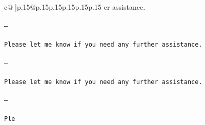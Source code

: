 \documentclass{article}
\begin{document}
{\begin{supertabular}{c@{$\;$}|p{.15\linewidth}@{}p{.15\linewidth}p{.15\linewidth}p{.15\linewidth}p{.15\linewidth}p{.15\linewidth}}
{{{er assistance. \\ \tt \\ \tt ---\\ \tt \\ \tt Please let me know if you need any further assistance. \\ \tt \\ \tt ---\\ \tt \\ \tt Please let me know if you need any further assistance. \\ \tt \\ \tt ---\\ \tt \\ \tt Ple}}}
\end{supertabular}}
\end{document}
